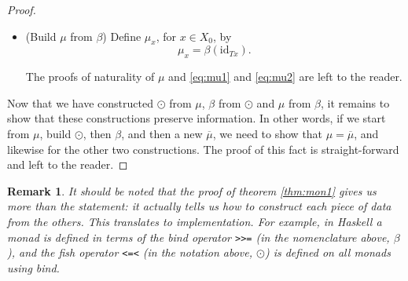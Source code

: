 \documentclass[11pt]{article}
\newtheorem{remark}{Remark}
\theoremstyle{nonumberplain}
\newtheorem{proof}{Proof}
\newcommand{\id}{\mathrm{id}}
\newcommand*\lsin{\lstinline}
\begin{document}
\begin{proof}
\begin{itemize}
\item (Build $\mu$ from $\beta$) Define $\mu_x$, for $x \in X_0$, by
\begin{equation}
\mu_x = \beta(\id_{Tx}).
\end{equation}

The proofs of naturality of $\mu$ and \eqref{eq:mu1} and \eqref{eq:mu2} are left to the reader.
\end{itemize}

Now that we have constructed $\odot$ from $\mu$, $\beta$ from $\odot$ and $\mu$ from $\beta$, it remains to show that these constructions preserve information. In other words, if we start from $\mu$, build $\odot$, then $\beta$, and then a new $\overline{\mu}$, we need to show that $\mu = \overline{\mu}$, and likewise for the other two constructions. The proof of this fact is straight-forward and left to the reader.
\end{proof}

\begin{remark}
It should be noted that the proof of theorem \ref{thm:mon1} gives us more than the statement: it actually tells us how to construct each piece of data from the others. This translates to implementation. For example, in Haskell a monad is defined in terms of the bind operator \lsin|>>=| (in the nomenclature above, $\beta$), and the fish operator \lsin|<=<| (in the notation above, $\odot$) is defined on all monads using bind.
\end{remark}
\end{document}
